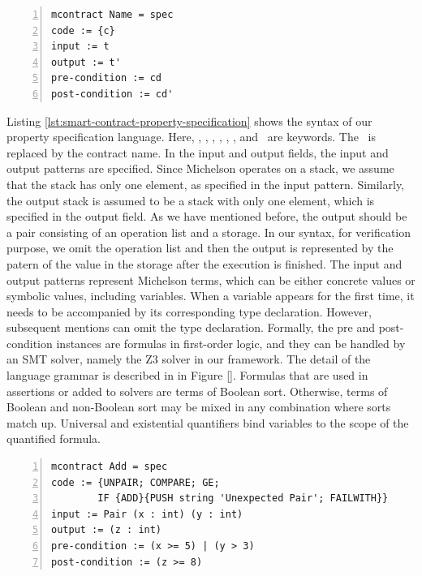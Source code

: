 \documentclass[a4paper,UKenglish,cleveref, autoref, thm-restate]{lipics-v2021}
\begin{document}
\begin{lstlisting}[float,captionpos=b,caption={Smart contract property specification},label={lst:smart-contract-property-specification},numbers=left]
mcontract Name = spec
code := {c}
input := t
output := t'
pre-condition := cd
post-condition := cd'
\end{lstlisting}
Listing \ref{lst:smart-contract-property-specification} shows the syntax of our property specification language. Here, \KMCONTRACT, \KWITH, \KCODE, \KINPUT, \KOUTPUT, \KPRECONDI, and \KPOSTCONDI\ are keywords. The \KNAME\ is replaced by the contract name. In the input and output fields, the input and output patterns are specified. Since Michelson operates on a stack, we assume that the stack has only one element, as specified in the input pattern. Similarly, the output stack is assumed to be a stack with only one element, which is specified in the output field. As we have mentioned before, the output should be a pair consisting of an operation list and a storage. In our syntax, for verification purpose, we omit the operation list and then the output is represented by the patern of the value in the storage after the execution is finished. The input and output patterns represent Michelson terms, which can be either concrete values or symbolic values, including variables. When a variable appears for the first time, it needs to be accompanied by its corresponding type declaration. However, subsequent mentions can omit the type declaration. Formally, the pre and post-condition instances are formulas in first-order logic, and they can be handled by an SMT solver, namely the Z3 solver in our framework. The detail of the language grammar is described in in Figure \ref{}. Formulas that are used in assertions or added to solvers are terms of Boolean sort. Otherwise, terms of Boolean and non-Boolean sort may be mixed in any combination where sorts match up. Universal and existential quantifiers bind variables to the scope of the quantified formula.
\begin{lstlisting}[float,captionpos=b,caption={The specification of Add contracr},label={lst:add-contract-specification},numbers=left]
mcontract Add = spec
code := {UNPAIR; COMPARE; GE; 
        IF {ADD}{PUSH string 'Unexpected Pair'; FAILWITH}}
input := Pair (x : int) (y : int)
output := (z : int)
pre-condition := (x >= 5) | (y > 3)
post-condition := (z >= 8)
\end{lstlisting}
\end{document}
